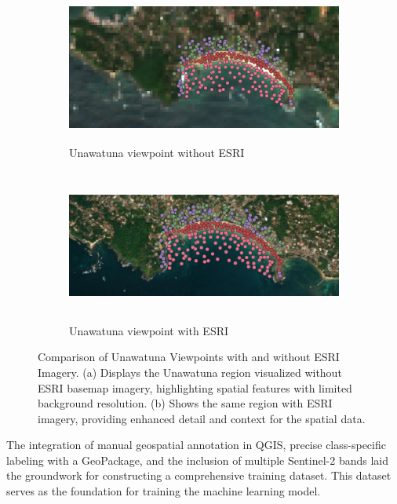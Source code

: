 \documentclass[a4paper,12pt]{article}
\begin{document}
\begin{figure}[H] %
    \centering
    \begin{subfigure}{\linewidth}
        \centering
        \includegraphics[width=\textwidth, height=5cm]{Unawantuna_Copernicushub/Labelling_without_esri.png}
        \caption{Unawatuna viewpoint without ESRI}
        \label{fig:label-without-esri}
    \end{subfigure}
    \vspace{0.2cm} %
    
    \begin{subfigure}{\linewidth}
        \centering
        \includegraphics[width=\textwidth, height=5cm]{Unawantuna_Copernicushub/Labelling with_Esri.png}
        \caption{Unawatuna viewpoint with ESRI}
        \label{fig:label-with-esri}
    \end{subfigure}
    
    \caption[Comparison of Unawatuna Viewpoints with and without ESRI Imagery]{Comparison of Unawatuna Viewpoints with and without ESRI Imagery. (a) Displays the Unawatuna region visualized without ESRI basemap imagery, highlighting spatial features with limited background resolution. (b) Shows the same region with ESRI imagery, providing enhanced detail and context for the spatial data.}
    \label{fig:comparison-unawatuna-label}
\end{figure}

The integration of manual geospatial annotation in QGIS, precise class-specific labeling with a GeoPackage, and the inclusion of multiple Sentinel-2 bands laid the groundwork for constructing a comprehensive training dataset. This dataset serves as the foundation for training the machine learning model.
\end{document}
